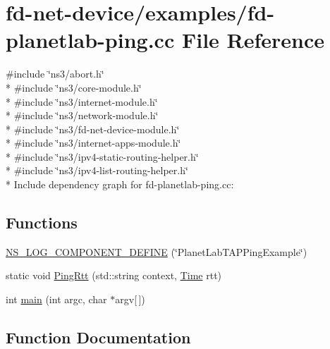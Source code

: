 \hypertarget{fd-planetlab-ping_8cc}{}\section{fd-\/net-\/device/examples/fd-\/planetlab-\/ping.cc File Reference}
\label{fd-planetlab-ping_8cc}
{\ttfamily \#include \char`\"{}ns3/abort.\+h\char`\"{}}\\*
{\ttfamily \#include \char`\"{}ns3/core-\/module.\+h\char`\"{}}\\*
{\ttfamily \#include \char`\"{}ns3/internet-\/module.\+h\char`\"{}}\\*
{\ttfamily \#include \char`\"{}ns3/network-\/module.\+h\char`\"{}}\\*
{\ttfamily \#include \char`\"{}ns3/fd-\/net-\/device-\/module.\+h\char`\"{}}\\*
{\ttfamily \#include \char`\"{}ns3/internet-\/apps-\/module.\+h\char`\"{}}\\*
{\ttfamily \#include \char`\"{}ns3/ipv4-\/static-\/routing-\/helper.\+h\char`\"{}}\\*
{\ttfamily \#include \char`\"{}ns3/ipv4-\/list-\/routing-\/helper.\+h\char`\"{}}\\*
Include dependency graph for fd-\/planetlab-\/ping.cc\+:
\subsection*{Functions}
\begin{DoxyCompactItemize}
\item 
\hyperlink{fd-planetlab-ping_8cc_a7cb6fad86f735344062bdcd27201c397}{N\+S\+\_\+\+L\+O\+G\+\_\+\+C\+O\+M\+P\+O\+N\+E\+N\+T\+\_\+\+D\+E\+F\+I\+NE} (\char`\"{}Planet\+Lab\+T\+A\+P\+Ping\+Example\char`\"{})
\item 
static void \hyperlink{fd-planetlab-ping_8cc_a1a49f760c7e3da367b3406515d2a3ef9}{Ping\+Rtt} (std\+::string context, \hyperlink{classns3_1_1Time}{Time} rtt)
\item 
int \hyperlink{fd-planetlab-ping_8cc_a0ddf1224851353fc92bfbff6f499fa97}{main} (int argc, char $\ast$argv\mbox{[}$\,$\mbox{]})
\end{DoxyCompactItemize}


\subsection{Function Documentation}
